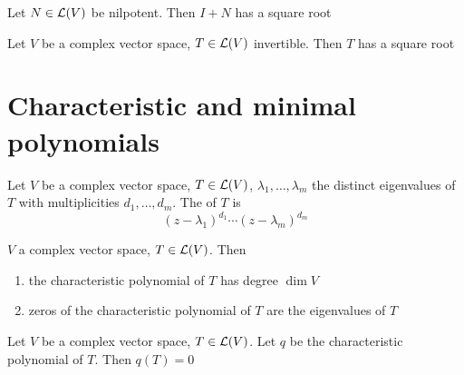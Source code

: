 \documentclass[aspectratio=169]{beamer}
\begin{document}
\begin{frame}
\begin{theorem}
Let $N\in\mathcal{L}(V)$ be nilpotent. Then $I+N$ has a square root
\end{theorem}
\vfill
\begin{theorem}[$T$ invertible has square root when $\IF=\IC$]
Let $V$ be a complex vector space, $T\in\mathcal{L}(V)$ invertible. Then $T$ has a square root
\end{theorem}
\end{frame}



\section{Characteristic and minimal polynomials}

\begin{frame}
\begin{definition}
Let $V$ be a complex vector space, $T\in\mathcal{L}(V)$, $\lambda_1,\ldots,\lambda_m$ the distinct eigenvalues of $T$ with multiplicities $d_1,\ldots,d_m$. The  of $T$ is
\[
(z-\lambda_1)^{d_1}\cdots(z-\lambda_m)^{d_m}
\]
\end{definition}

\begin{theorem}
$V$ a complex vector space, $T\in\mathcal{L}(V)$. Then
\begin{enumerate}
\item the characteristic polynomial of $T$ has degree $\dim V$
\item zeros of the characteristic polynomial of $T$ are the eigenvalues of $T$
\end{enumerate}
\end{theorem}

\begin{importanttheorem}
Let $V$ be a complex vector space, $T\in\mathcal{L}(V)$. Let $q$ be the characteristic polynomial of $T$. Then $q(T)=0$
\end{importanttheorem}
\end{frame}
\end{document}
